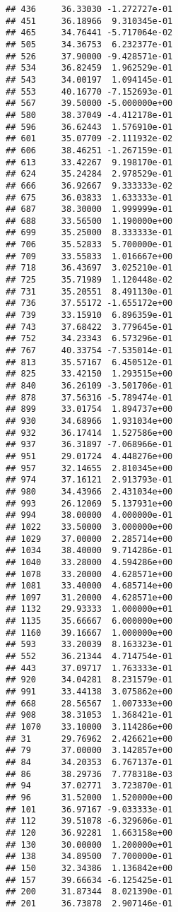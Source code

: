 \documentclass[
]{article}
\begin{document}
\begin{verbatim}
## 436     36.33030 -1.272727e-01
## 451     36.18966  9.310345e-01
## 465     34.76441 -5.717064e-02
## 505     34.36753  6.232377e-01
## 526     37.90000 -9.428571e-01
## 534     36.82459  1.962529e-01
## 543     34.00197  1.094145e-01
## 553     40.16770 -7.152693e-01
## 567     39.50000 -5.000000e+00
## 580     38.37049 -4.412178e-01
## 596     36.62443  1.576910e-01
## 601     35.07709 -2.111932e-02
## 606     38.46251 -1.267159e-01
## 613     33.42267  9.198170e-01
## 624     35.24284  2.978529e-01
## 666     36.92667  9.333333e-02
## 675     36.03833  1.633333e-01
## 687     38.30000  1.999999e-01
## 688     33.56500  1.190000e+00
## 699     35.25000  8.333333e-01
## 706     35.52833  5.700000e-01
## 709     33.55833  1.016667e+00
## 718     36.43697  3.025210e-01
## 725     35.71989  1.120448e-02
## 731     35.20551  8.491130e-01
## 736     37.55172 -1.655172e+00
## 739     33.15910  6.896359e-01
## 743     37.68422  3.779645e-01
## 752     34.23343  6.573296e-01
## 767     40.33754 -7.535014e-01
## 813     35.57167  6.450512e-01
## 825     33.42150  1.293515e+00
## 840     36.26109 -3.501706e-01
## 878     37.56316 -5.789474e-01
## 899     33.01754  1.894737e+00
## 930     34.68966  1.931034e+00
## 932     36.17414  1.527586e+00
## 937     36.31897 -7.068966e-01
## 951     29.01724  4.448276e+00
## 957     32.14655  2.810345e+00
## 974     37.16121  2.913793e-01
## 980     34.43966  2.431034e+00
## 993     26.12069  5.137931e+00
## 994     38.00000  4.000000e-01
## 1022    33.50000  3.000000e+00
## 1029    37.00000  2.285714e+00
## 1034    38.40000  9.714286e-01
## 1040    33.28000  4.594286e+00
## 1078    33.20000  4.628571e+00
## 1081    33.40000  4.685714e+00
## 1097    31.20000  4.628571e+00
## 1132    29.93333  1.000000e+01
## 1135    35.66667  6.000000e+00
## 1160    39.16667  1.000000e+00
## 593     33.20039  8.163323e-01
## 552     36.21344  4.714754e-01
## 443     37.09717  1.763333e-01
## 920     34.04281  8.231579e-01
## 991     33.44138  3.075862e+00
## 668     28.56567  1.007333e+00
## 908     38.31053  1.368421e-01
## 1070    33.10000  3.114286e+00
## 31      29.76962  2.426621e+00
## 79      37.00000  3.142857e+00
## 84      34.20353  6.767137e-01
## 86      38.29736  7.778318e-03
## 94      37.02771  3.723870e-01
## 96      31.52000  1.520000e+00
## 101     36.97167 -9.033333e-01
## 112     39.51078 -6.329606e-01
## 120     36.92281  1.663158e+00
## 130     30.00000  1.200000e+01
## 138     34.89500  7.700000e-01
## 150     32.34386  1.136842e+00
## 157     39.66634 -6.125425e-01
## 200     31.87344  8.021390e-01
## 201     36.73878  2.907146e-01

\end{verbatim}
\end{document}

